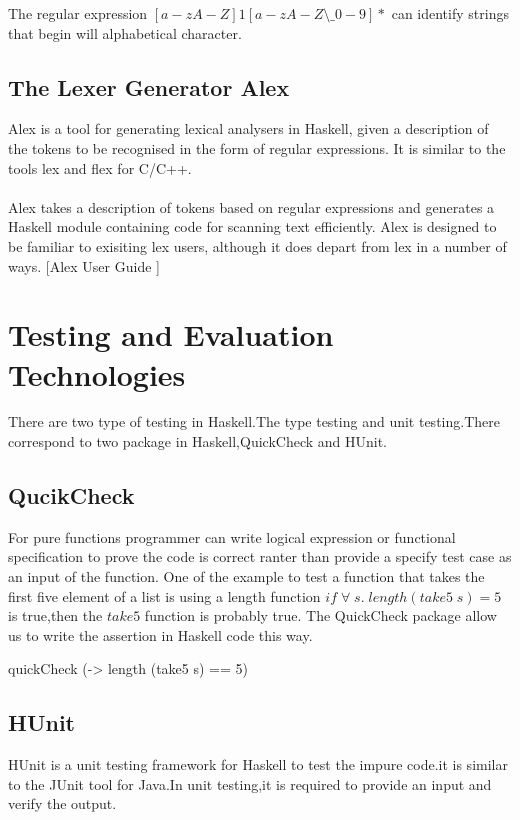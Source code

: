 The regular expression $ [a-zA-Z]{1}[a-zA-Z\setminus\_0-9]*  $ can identify strings that begin will alphabetical character.


\subsection{The Lexer Generator Alex}
Alex is a tool for generating lexical analysers in Haskell, given a description of the tokens to be recognised in the form of regular expressions. It is similar to the tools lex and flex for C/C++.
\\\\
Alex takes a description of tokens based on regular expressions and generates a Haskell module containing code for scanning text efficiently. Alex is designed to be familiar to exisiting lex users, although it does depart from lex in a number of ways.
[Alex User Guide  ]

\section{Testing and Evaluation Technologies}
There are two type of testing in Haskell.The type testing and unit testing.There correspond to two package in Haskell,QuickCheck and HUnit.
\subsection*{QucikCheck}
For pure functions programmer can write logical expression or functional specification to prove the code is correct ranter than provide a specify test case as an input of the function.
One of the example to test a function that takes the first five element of a list is using a length function $ if \;\forall \;s.\; length(take5 \;s) = 5 \;$ is true,then the $take5$ function is probably true.
The QuickCheck package allow us to write the assertion in Haskell code this way.
\begin{hcode}
quickCheck (\s -> length (take5 s) == 5)
\end{hcode}

\subsection*{HUnit}
HUnit is a unit testing framework for Haskell to test the impure code.it is similar to the JUnit tool for Java.In unit testing,it is required to provide an input and verify the output.


